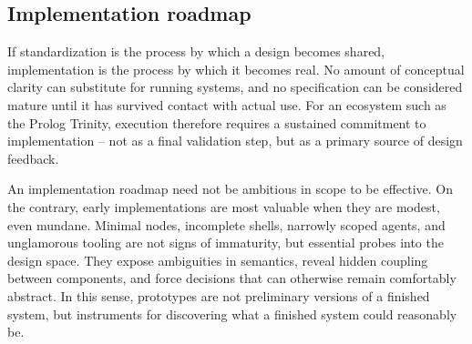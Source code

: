 %
%
%


\subsection{Implementation roadmap}\label{sec:implementation-roadmap}

If standardization is the process by which a design becomes shared, implementation is the process by which it becomes real. No amount of conceptual clarity can substitute for running systems, and no specification can be considered mature until it has survived contact with actual use. For an ecosystem such as the Prolog Trinity, execution therefore requires a sustained commitment to implementation -- not as a final validation step, but as a primary source of design feedback.

An implementation roadmap need not be ambitious in scope to be effective. On the contrary, early implementations are most valuable when they are modest, even mundane. Minimal nodes, incomplete shells, narrowly scoped agents, and unglamorous tooling are not signs of immaturity, but essential probes into the design space. They expose ambiguities in semantics, reveal hidden coupling between components, and force decisions that can otherwise remain comfortably abstract. In this sense, prototypes are not preliminary versions of a finished system, but instruments for discovering what a finished system could reasonably be.

